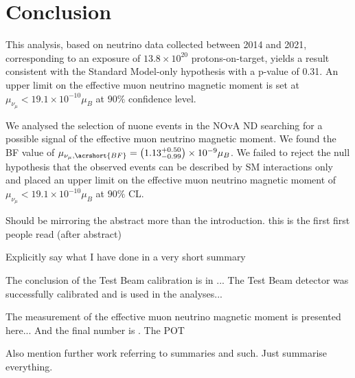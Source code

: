 \chapter{Conclusion}\label{sec:Conclusion}

This analysis, based on neutrino data collected between 2014 and 2021, corresponding to an exposure of $13.8\times10^{20}$ protons-on-target, yields a result consistent with the Standard Model-only hypothesis with a p-value of 0.31. An upper limit on the effective muon neutrino magnetic moment is set at $\mu_{\nu_\mu}<19.1\times 10^{-10}\mu_B$ at $90\%$ confidence level.

We analysed the selection of \gls{nuone} events in the \gls{NOvA} \gls{ND} searching for a possible signal of the effective muon neutrino magnetic moment. We found the \gls{BF} value of $\mu_{\nu_\mu,\acrshort{BF}}=\left(1.13^{+0.50}_{-0.99}\right)\times 10^{-9}\mu_B$. We failed to reject the null hypothesis that the observed events can be described by \gls{SM} interactions only and placed an upper limit on the effective muon neutrino magnetic moment of $\mu_{\nu_\mu}<19.1\times10^{-10}\mu_B$ at $90\%$ \gls{CL}.

Should be mirroring the abstract more than the introduction. this is the first first people read (after abstract)

Explicitly say what I have done in a very short summary

The conclusion of the Test Beam calibration is in ... The Test Beam detector was successfully calibrated and is used in the analyses...

The measurement of the effective muon neutrino magnetic moment is presented here... And the final number is . The POT

Also mention further work referring to summaries and such. Just summarise everything.